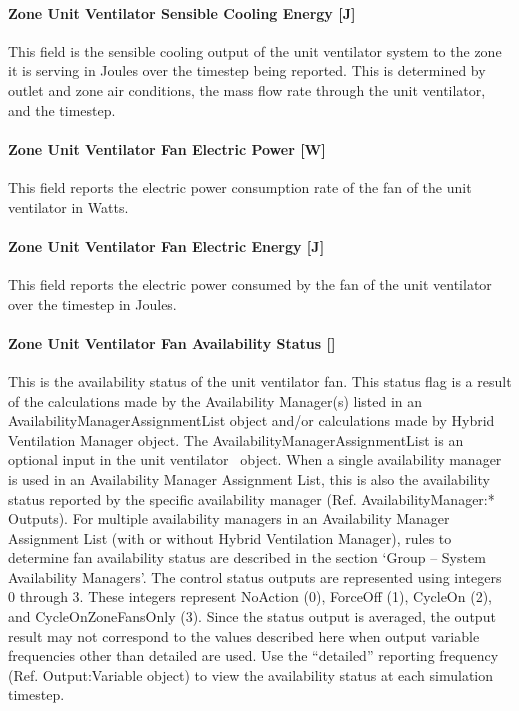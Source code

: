 \paragraph{Zone Unit Ventilator Sensible Cooling Energy {[}J{]}}\label{zone-unit-ventilator-sensible-cooling-energy-j}

This field is the sensible cooling output of the unit ventilator system to the zone it is serving in Joules over the timestep being reported. This is determined by outlet and zone air conditions, the mass flow rate through the unit ventilator, and the timestep.

\paragraph{Zone Unit Ventilator Fan Electric Power {[}W{]}}\label{zone-unit-ventilator-fan-electric-power-w}

This field reports the electric power consumption rate of the fan of the unit ventilator in Watts.

\paragraph{Zone Unit Ventilator Fan Electric Energy {[}J{]}}\label{zone-unit-ventilator-fan-electric-energy-j}

This field reports the electric power consumed by the fan of the unit ventilator over the timestep in Joules.

\paragraph{Zone Unit Ventilator Fan Availability Status {[]}}\label{zone-unit-ventilator-fan-availability-status}

This is the availability status of the unit ventilator fan. This status flag is a result of the calculations made by the Availability Manager(s) listed in an AvailabilityManagerAssignmentList object and/or calculations made by Hybrid Ventilation Manager object. The AvailabilityManagerAssignmentList is an optional input in the unit ventilator~ object. When a single availability manager is used in an Availability Manager Assignment List, this is also the availability status reported by the specific availability manager (Ref. AvailabilityManager:* Outputs). For multiple availability managers in an Availability Manager Assignment List (with or without Hybrid Ventilation Manager), rules to determine fan availability status are described in the section `Group -- System Availability Managers'. The control status outputs are represented using integers 0 through 3. These integers represent NoAction (0), ForceOff (1), CycleOn (2), and CycleOnZoneFansOnly (3). Since the status output is averaged, the output result may not correspond to the values described here when output variable frequencies other than detailed are used. Use the ``detailed'' reporting frequency (Ref. Output:Variable object) to view the availability status at each simulation timestep.

